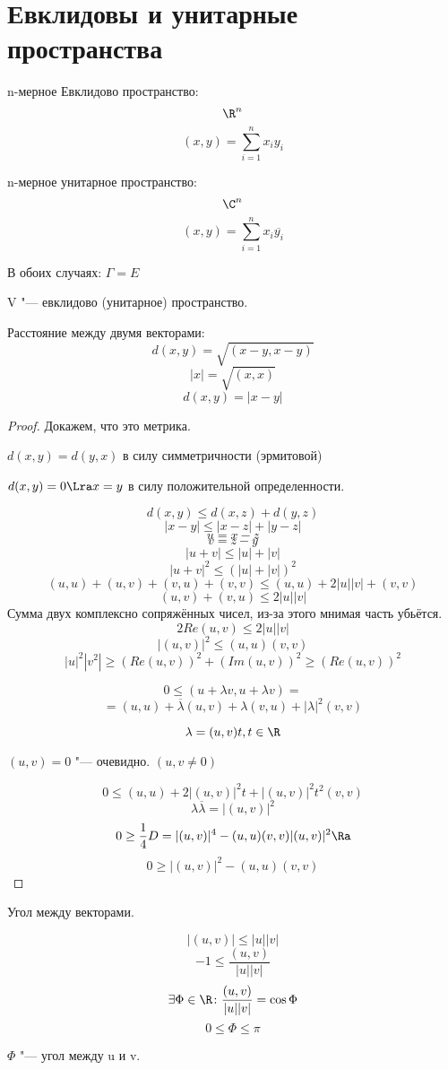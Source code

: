 \section{Евклидовы и унитарные пространства}

\begin{Def}
n-мерное Евклидово пространство:
$$\R^n$$
$$(x, y) = \sum_{i = 1}^{n}x_iy_i$$
                                

n-мерное унитарное пространство:
$$\C^{n}$$
$$(x, y) = \sum_{i = 1}^{n}x_i \overline{y_i}$$
                                 

В обоих случаях: $\Gamma = E$
\end{Def}


\begin{Def}

V "--- евклидово (унитарное) пространство.

 
Расстояние между двумя векторами:
$$d(x, y) = \sqrt{(x - y, x - y)}$$
$$|x| = \sqrt{(x, x)}$$
$$d(x, y) = |x - y|$$
\end{Def}

\begin{proof}

Докажем, что это метрика. 

$d(x, y) = d(y, x)$ в силу симметричности (эрмитовой)

$d(x, y) = 0 \Lra x = y$ в силу положительной определенности. 

$$d(x, y) \le d(x, z) + d(y, z)$$
$$|x - y| \le |x - z| + |y - z|$$            
$$u = x - z$$
$$v = z - y$$
$$|u + v| \le |u| + |v|$$
$$|u + v|^2 \le (|u| + |v|)^2$$
$$(u, u) + (u, v) + (v, u) + (v, v) \le (u, u) + 2|u||v| + (v, v)$$
$$(u, v) + (v, u) \le 2|u||v|$$
Сумма двух комплексно сопряжённых чисел, из-за этого мнимая часть убьётся. 
$$2Re(u, v) \le 2|u||v|$$
$$|(u, v)|^2 \le (u, u)(v, v)$$
$$|u|^2 |v^2| \ge (Re(u, v))^2 + (Im(u, v))^2 \ge (Re(u,v))^2$$



$$0 \le (u + \lambda v, u + \lambda v) = $$
$$= (u, u) + \overline{\lambda}(u, v) + \lambda(v, u) + |\lambda|^2(v, v)$$

$$\lambda = (u, v)t, t \in \R$$

$(u, v) = 0$ "--- очевидно. 
$(u, v \ne 0)$

$$0 \le (u, u) + 2|(u, v)|^2t + |(u, v)|^2t^2(v, v)$$
$$\lambda\overline{\lambda} = |(u, v)|^2$$
$$0 \ge \frac{1}{4}D = |(u,v)|^4 - (u, u)(v, v)|(u, v)|^2 \Ra$$
$$0 \ge |(u, v)|^2 - (u, u)(v, v)$$
\end{proof}

\begin{Def}
Угол между векторами. 

$$|(u, v)| \le |u||v|$$
$$-1 \le \frac{(u, v)}{|u||v|}$$
$$\exists \Phi \in \R  \colon \frac{(u,v)}{|u||v|} = \cos \Phi$$
$$0 \le \Phi \le \pi$$

$\Phi$ "--- угол между u и v.
\end{Def} 
